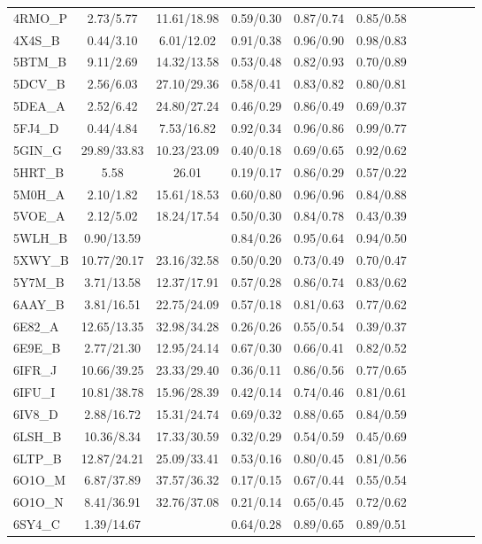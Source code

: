 \begin{tabular}{lcccccccccc}
4RMO\_P & 2.73/5.77 & 11.61/18.98 & 0.59/0.30 & 0.87/0.74 & 0.85/0.58 \\
4X4S\_B & 0.44/3.10 & 6.01/12.02 & 0.91/0.38 & 0.96/0.90 & 0.98/0.83 \\
5BTM\_B & 9.11/2.69 & 14.32/13.58 & 0.53/0.48 & 0.82/0.93 & 0.70/0.89 \\
5DCV\_B & 2.56/6.03 & 27.10/29.36 & 0.58/0.41 & 0.83/0.82 & 0.80/0.81 \\
5DEA\_A & 2.52/6.42 & 24.80/27.24 & 0.46/0.29 & 0.86/0.49 & 0.69/0.37 \\
5FJ4\_D & 0.44/4.84 & 7.53/16.82 & 0.92/0.34 & 0.96/0.86 & 0.99/0.77 \\
5GIN\_G & 29.89/33.83 & 10.23/23.09 & 0.40/0.18 & 0.69/0.65 & 0.92/0.62 \\
5HRT\_B & 5.58 & 26.01 & 0.19/0.17 & 0.86/0.29 & 0.57/0.22 \\
5M0H\_A & 2.10/1.82 & 15.61/18.53 & 0.60/0.80 & 0.96/0.96 & 0.84/0.88 \\
5VOE\_A & 2.12/5.02 & 18.24/17.54 & 0.50/0.30 & 0.84/0.78 & 0.43/0.39 \\
5WLH\_B & 0.90/13.59 &  & 0.84/0.26 & 0.95/0.64 & 0.94/0.50 \\
5XWY\_B & 10.77/20.17 & 23.16/32.58 & 0.50/0.20 & 0.73/0.49 & 0.70/0.47 \\
5Y7M\_B & 3.71/13.58 & 12.37/17.91 & 0.57/0.28 & 0.86/0.74 & 0.83/0.62 \\
6AAY\_B & 3.81/16.51 & 22.75/24.09 & 0.57/0.18 & 0.81/0.63 & 0.77/0.62 \\
6E82\_A & 12.65/13.35 & 32.98/34.28 & 0.26/0.26 & 0.55/0.54 & 0.39/0.37 \\
6E9E\_B & 2.77/21.30 & 12.95/24.14 & 0.67/0.30 & 0.66/0.41 & 0.82/0.52 \\
6IFR\_J & 10.66/39.25 & 23.33/29.40 & 0.36/0.11 & 0.86/0.56 & 0.77/0.65 \\
6IFU\_I & 10.81/38.78 & 15.96/28.39 & 0.42/0.14 & 0.74/0.46 & 0.81/0.61 \\
6IV8\_D & 2.88/16.72 & 15.31/24.74 & 0.69/0.32 & 0.88/0.65 & 0.84/0.59 \\
6LSH\_B & 10.36/8.34 & 17.33/30.59 & 0.32/0.29 & 0.54/0.59 & 0.45/0.69 \\
6LTP\_B & 12.87/24.21 & 25.09/33.41 & 0.53/0.16 & 0.80/0.45 & 0.81/0.56 \\
6O1O\_M & 6.87/37.89 & 37.57/36.32 & 0.17/0.15 & 0.67/0.44 & 0.55/0.54 \\
6O1O\_N & 8.41/36.91 & 32.76/37.08 & 0.21/0.14 & 0.65/0.45 & 0.72/0.62 \\
6SY4\_C & 1.39/14.67 &  & 0.64/0.28 & 0.89/0.65 & 0.89/0.51 \\

\end{tabular}
